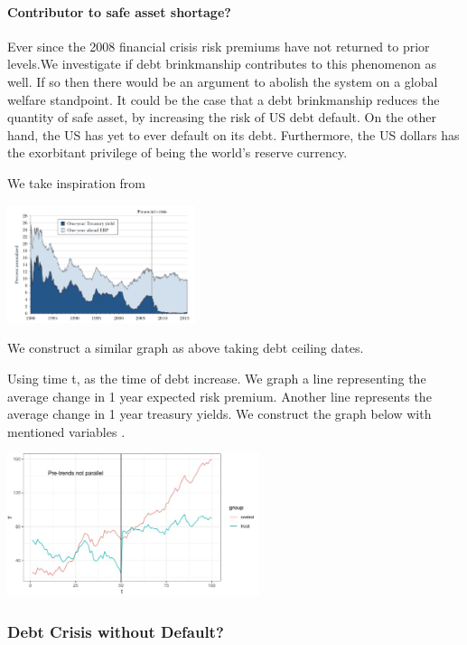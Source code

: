 \documentclass[
  12pt]{article}
\let\oldparagraph\paragraph
\renewcommand{\paragraph}[1]{\oldparagraph{#1}\mbox{}}
\begin{document}
\hypertarget{contributor-to-safe-asset-shortage}{%
\paragraph{Contributor to safe asset
shortage?}\label{contributor-to-safe-asset-shortage}}

Ever since the 2008 financial crisis risk premiums have not returned to
prior levels\citep{caballero2017}.We investigate if debt brinkmanship
contributes to this phenomenon as well. If so then there would be an
argument to abolish the system on a global welfare standpoint. It could
be the case that a debt brinkmanship reduces the quantity of safe asset,
by increasing the risk of US debt default. On the other hand, the US has
yet to ever default on its debt. Furthermore, the US dollars has the
exorbitant privilege of being the world's reserve currency.

We take inspiration from

\includegraphics[width=2.16667in,height=\textheight]{style-guide/1_year_ERP.png}

We construct a similar graph as above taking debt ceiling dates.

Using time t, as the time of debt increase. We graph a line representing
the average change in 1 year expected risk premium. Another line
represents the average change in 1 year treasury yields. We construct
the graph below with mentioned variables \citep{duarte2015}.

\includegraphics[width=2.90625in,height=\textheight]{style-guide/1_year_ERP_parallel_trends.jpeg}

\hypertarget{debt-crisis-without-default-1}{%
\subsubsection{Debt Crisis without
Default?}\label{debt-crisis-without-default-1}}
\end{document}
